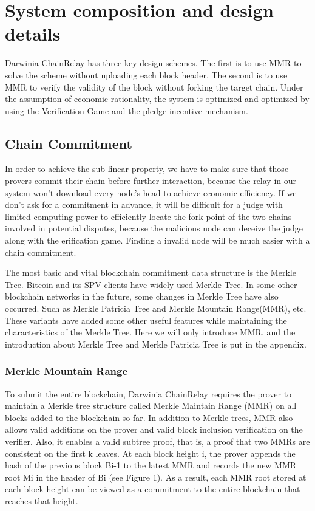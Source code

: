 \section{System composition and design details}

Darwinia ChainRelay has three key design schemes. The first is to use MMR to solve the scheme without uploading each block header. The second is to use MMR to verify the validity of the block without forking the target chain. Under the assumption of economic rationality, the system is optimized and optimized by using the Verification Game and the pledge incentive mechanism.

\subsection*{Chain Commitment}

In order to achieve the sub-linear property, we have to make sure that those provers commit their chain before further interaction, because the relay in our system won't download every node's head to achieve economic efficiency. If we don't ask for a commitment in advance, it will be difficult for a judge with limited computing power to efficiently locate the fork point of the two chains involved in potential disputes, because the malicious node can deceive the judge along with the erification game. Finding a invalid node will be much easier with a chain commitment.

The most basic and vital blockchain commitment data structure is the Merkle Tree. Bitcoin and its SPV clients have widely used Merkle Tree. In some other blockchain networks in the future, some changes in Merkle Tree have also occurred. Such as Merkle Patricia Tree and Merkle Mountain Range(MMR), etc. These variants have added some other useful features while maintaining the characteristics of the Merkle Tree. Here we will only introduce MMR, and the introduction about Merkle Tree and Merkle Patricia Tree is put in the appendix.

\subsubsection*{Merkle Mountain Range}

To submit the entire blockchain, Darwinia ChainRelay requires the prover to maintain a Merkle tree structure called Merkle Maintain Range (MMR) on all blocks added to the blockchain so far. In addition to Merkle trees, MMR also allows valid additions on the prover and valid block inclusion verification on the verifier. Also, it enables a valid subtree proof, that is, a proof that two MMRs are consistent on the first k leaves. At each block height i, the prover appends the hash of the previous block Bi-1 to the latest MMR and records the new MMR root Mi in the header of Bi (see Figure 1). As a result, each MMR root stored at each block height can be viewed as a commitment to the entire blockchain that reaches that height.


